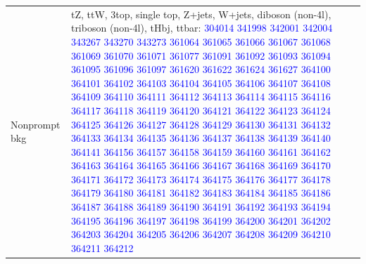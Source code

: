 \documentclass[11pt]{article}
\begin{document}
\begin{table}[htp]
\begin{center}
\begin{tabular}{|l|p{10cm}|}
			Nonprompt bkg &  tZ, ttW, 3top, single top, Z+jets, W+jets, diboson (non-4l), triboson (non-4l), tHbj, ttbar: \textcolor{blue}{304014} \textcolor{blue}{341998} \textcolor{blue}{342001} \textcolor{blue}{342004} \textcolor{blue}{343267} \textcolor{blue}{343270} \textcolor{blue}{343273} \textcolor{blue}{361064} \textcolor{blue}{361065} \textcolor{blue}{361066} \textcolor{blue}{361067} \textcolor{blue}{361068} \textcolor{blue}{361069} \textcolor{blue}{361070} \textcolor{blue}{361071} \textcolor{blue}{361077} \textcolor{blue}{361091} \textcolor{blue}{361092} \textcolor{blue}{361093} \textcolor{blue}{361094} \textcolor{blue}{361095} \textcolor{blue}{361096} \textcolor{blue}{361097} \textcolor{blue}{361620} \textcolor{blue}{361622} \textcolor{blue}{361624} \textcolor{blue}{361627} \textcolor{blue}{364100} \textcolor{blue}{364101} \textcolor{blue}{364102} \textcolor{blue}{364103} \textcolor{blue}{364104} \textcolor{blue}{364105} \textcolor{blue}{364106} \textcolor{blue}{364107} \textcolor{blue}{364108} \textcolor{blue}{364109} \textcolor{blue}{364110} \textcolor{blue}{364111} \textcolor{blue}{364112} \textcolor{blue}{364113} \textcolor{blue}{364114} \textcolor{blue}{364115} \textcolor{blue}{364116} \textcolor{blue}{364117} \textcolor{blue}{364118} \textcolor{blue}{364119} \textcolor{blue}{364120} \textcolor{blue}{364121} \textcolor{blue}{364122} \textcolor{blue}{364123} \textcolor{blue}{364124} \textcolor{blue}{364125} \textcolor{blue}{364126} \textcolor{blue}{364127} \textcolor{blue}{364128} \textcolor{blue}{364129} \textcolor{blue}{364130} \textcolor{blue}{364131} \textcolor{blue}{364132} \textcolor{blue}{364133} \textcolor{blue}{364134} \textcolor{blue}{364135} \textcolor{blue}{364136} \textcolor{blue}{364137} \textcolor{blue}{364138} \textcolor{blue}{364139} \textcolor{blue}{364140} \textcolor{blue}{364141} \textcolor{blue}{364156} \textcolor{blue}{364157} \textcolor{blue}{364158} \textcolor{blue}{364159} \textcolor{blue}{364160} \textcolor{blue}{364161} \textcolor{blue}{364162} \textcolor{blue}{364163} \textcolor{blue}{364164} \textcolor{blue}{364165} \textcolor{blue}{364166} \textcolor{blue}{364167} \textcolor{blue}{364168} \textcolor{blue}{364169} \textcolor{blue}{364170} \textcolor{blue}{364171} \textcolor{blue}{364172} \textcolor{blue}{364173} \textcolor{blue}{364174} \textcolor{blue}{364175} \textcolor{blue}{364176} \textcolor{blue}{364177} \textcolor{blue}{364178} \textcolor{blue}{364179} \textcolor{blue}{364180} \textcolor{blue}{364181} \textcolor{blue}{364182} \textcolor{blue}{364183} \textcolor{blue}{364184} \textcolor{blue}{364185} \textcolor{blue}{364186} \textcolor{blue}{364187} \textcolor{blue}{364188} \textcolor{blue}{364189} \textcolor{blue}{364190} \textcolor{blue}{364191} \textcolor{blue}{364192} \textcolor{blue}{364193} \textcolor{blue}{364194} \textcolor{blue}{364195} \textcolor{blue}{364196} \textcolor{blue}{364197} \textcolor{blue}{364198} \textcolor{blue}{364199} \textcolor{blue}{364200} \textcolor{blue}{364201} \textcolor{blue}{364202} \textcolor{blue}{364203} \textcolor{blue}{364204} \textcolor{blue}{364205} \textcolor{blue}{364206} \textcolor{blue}{364207} \textcolor{blue}{364208} \textcolor{blue}{364209} \textcolor{blue}{364210} \textcolor{blue}{364211} \textcolor{blue}{364212} 
\end{tabular}
\end{center}
\end{table}
\end{document}
